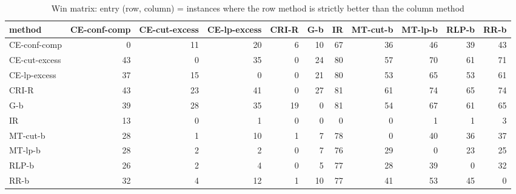 \begin{table}[htbp]
\centering
\small
\caption{Win matrix: entry (row, column) = instances where the row method is strictly better than the column method}
\label{tab:E2b_head_to_head_budgets_b1_wins}
\begin{tabular}{lrrrrrrrrrr}
\toprule
method & CE-conf-comp & CE-cut-excess & CE-lp-excess & CRI-R & G-b & IR & MT-cut-b & MT-lp-b & RLP-b & RR-b \\
\midrule
CE-conf-comp & 0 & 11 & 20 & 6 & 10 & 67 & 36 & 46 & 39 & 43 \\
CE-cut-excess & 43 & 0 & 35 & 0 & 24 & 80 & 57 & 70 & 61 & 71 \\
CE-lp-excess & 37 & 15 & 0 & 0 & 21 & 80 & 53 & 65 & 53 & 61 \\
CRI-R & 43 & 23 & 41 & 0 & 27 & 81 & 61 & 74 & 65 & 74 \\
G-b & 39 & 28 & 35 & 19 & 0 & 81 & 54 & 67 & 61 & 65 \\
IR & 13 & 0 & 1 & 0 & 0 & 0 & 0 & 1 & 1 & 3 \\
MT-cut-b & 28 & 1 & 10 & 1 & 7 & 78 & 0 & 40 & 36 & 37 \\
MT-lp-b & 28 & 2 & 2 & 0 & 7 & 76 & 29 & 0 & 23 & 25 \\
RLP-b & 26 & 2 & 4 & 0 & 5 & 77 & 28 & 39 & 0 & 32 \\
RR-b & 32 & 4 & 12 & 1 & 10 & 77 & 41 & 53 & 45 & 0 \\
\bottomrule
\end{tabular}
\end{table}
